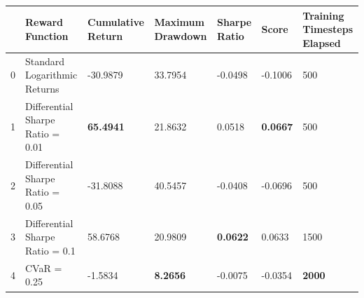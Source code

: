 \begin{tabular}{lllllll}
\toprule
 & Reward Function & Cumulative Return & Maximum Drawdown & Sharpe Ratio & Score & Training Timesteps Elapsed \\
\midrule
0 & Standard Logarithmic Returns & -30.9879 & 33.7954 & -0.0498 & -0.1006 & 500 \\
1 & Differential Sharpe Ratio = 0.01 & \textbf{65.4941} & 21.8632 & 0.0518 & \textbf{0.0667} & 500 \\
2 & Differential Sharpe Ratio = 0.05 & -31.8088 & 40.5457 & -0.0408 & -0.0696 & 500 \\
3 & Differential Sharpe Ratio = 0.1 & 58.6768 & 20.9809 & \textbf{0.0622} & 0.0633 & 1500 \\
4 & CVaR = 0.25 & -1.5834 & \textbf{8.2656} & -0.0075 & -0.0354 & \textbf{2000} \\
\bottomrule
\end{tabular}
